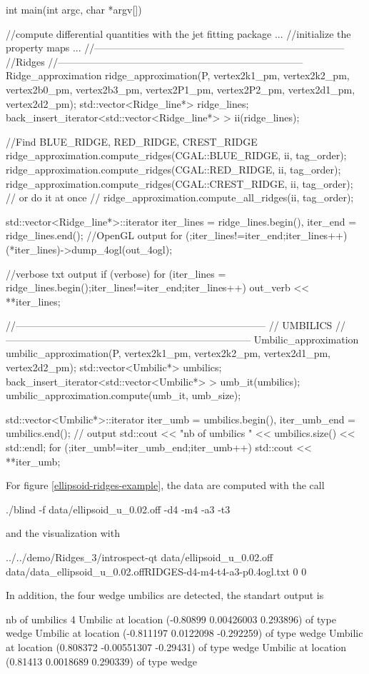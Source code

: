 \begin{ccExampleCode}
int main(int argc, char *argv[])
{  
  //compute differential quantities with the jet fitting package
	...
  //initialize the property maps
	...
   //---------------------------------------------------------------------------
  //Ridges
  //--------------------------------------------------------------------------
  Ridge_approximation ridge_approximation(P, 
					  vertex2k1_pm, vertex2k2_pm,
					  vertex2b0_pm, vertex2b3_pm,
					  vertex2P1_pm, vertex2P2_pm,
					  vertex2d1_pm, vertex2d2_pm);
  std::vector<Ridge_line*> ridge_lines;
  back_insert_iterator<std::vector<Ridge_line*> > ii(ridge_lines);
  
  //Find BLUE_RIDGE, RED_RIDGE, CREST_RIDGE
     ridge_approximation.compute_ridges(CGAL::BLUE_RIDGE, ii, tag_order);  
     ridge_approximation.compute_ridges(CGAL::RED_RIDGE, ii, tag_order);  
     ridge_approximation.compute_ridges(CGAL::CREST_RIDGE, ii, tag_order);  
  // or do it at once
  // ridge_approximation.compute_all_ridges(ii, tag_order);  
 
  std::vector<Ridge_line*>::iterator iter_lines = ridge_lines.begin(), 
    iter_end = ridge_lines.end();
  //OpenGL output
  for (;iter_lines!=iter_end;iter_lines++) (*iter_lines)->dump_4ogl(out_4ogl);
    
  //verbose txt output 
  if (verbose) 
    for (iter_lines = ridge_lines.begin();iter_lines!=iter_end;iter_lines++) 
      out_verb << **iter_lines; 

  //---------------------------------------------------------------------------
  // UMBILICS
  //--------------------------------------------------------------------------
  Umbilic_approximation umbilic_approximation(P, 
					      vertex2k1_pm, vertex2k2_pm,
					      vertex2d1_pm, vertex2d2_pm);
  std::vector<Umbilic*> umbilics;
  back_insert_iterator<std::vector<Umbilic*> > umb_it(umbilics);
  umbilic_approximation.compute(umb_it, umb_size);

  std::vector<Umbilic*>::iterator iter_umb = umbilics.begin(), 
    iter_umb_end = umbilics.end();
  // output
  std::cout << "nb of umbilics " << umbilics.size() << std::endl;
  for (;iter_umb!=iter_umb_end;iter_umb++) std::cout << **iter_umb;
}
\end{ccExampleCode}

For figure \ref{ellipsoid-ridges-example}, the data are computed with
the call
\begin{ccExampleCode}
./blind -f data/ellipsoid_u_0.02.off -d4 -m4 -a3 -t3
\end{ccExampleCode}
and the visualization with 
\begin{ccExampleCode}
 ../../demo/Ridges_3/introspect-qt data/ellipsoid_u_0.02.off data/data_ellipsoid_u_0.02.offRIDGES-d4-m4-t4-a3-p0.4ogl.txt 0 0
\end{ccExampleCode}
In addition, the four wedge umbilics are detected, the standart output is 
\begin{ccExampleCode}
nb of umbilics 4
Umbilic at location (-0.80899 0.00426003 0.293896) of type wedge
Umbilic at location (-0.811197 0.0122098 -0.292259) of type wedge
Umbilic at location (0.808372 -0.00551307 -0.29431) of type wedge
Umbilic at location (0.81413 0.0018689 0.290339) of type wedge
\end{ccExampleCode}


